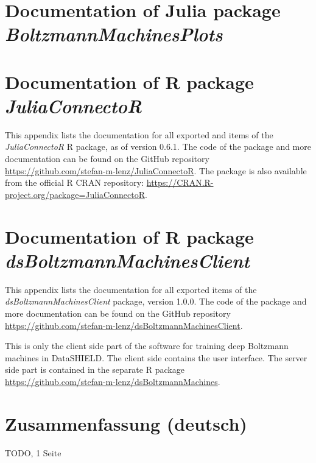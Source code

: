 \documentclass[12pt]{article}
\newcommand{\apkg}[1]{\emph{#1}}
\begin{document}
\begin{appendices}
\section[Documentation of Julia package \apkg{BoltzmannMachinesPlots}]{Documentation of Julia package \\ \apkg{BoltzmannMachinesPlots}}

\label{BMPlotsDoku}


\clearpage
\section[Documentation of R package \apkg{JuliaConnectoR}]{Documentation of R package \\ \apkg{JuliaConnectoR}}
This appendix lists the documentation for all exported and items of the \apkg{JuliaConnectoR} R package, as of version 0.6.1. The code of the package and more documentation can be found on the GitHub repository \url{https://github.com/stefan-m-lenz/JuliaConnectoR}. The package is also available from the official R CRAN repository: \url{https://CRAN.R-project.org/package=JuliaConnectoR}.



\clearpage
\section[Documentation of R package \apkg{dsBoltzmannMachinesClient}]{Documentation of R package \\ \apkg{dsBoltzmannMachinesClient}}
This appendix lists the documentation for all exported items of the \apkg{dsBoltzmannMachinesClient} package, version 1.0.0. %
The code of the package and more documentation can be found on the GitHub repository\\ \url{https://github.com/stefan-m-lenz/dsBoltzmannMachinesClient}.

This is only the client side part of the software for training deep Boltzmann machines in DataSHIELD. The client side contains the user interface. The server side part is contained in the separate R package \\
\url{https://github.com/stefan-m-lenz/dsBoltzmannMachines}.



\clearpage
\section{Zusammenfassung (deutsch)}
TODO, 1 Seite


\end{appendices}
\end{document}

